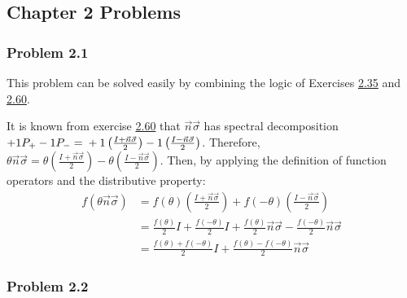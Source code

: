 \subsection{Chapter 2 Problems}
\subsubsection{Problem 2.1}
This problem can be solved easily by combining the
logic of Exercises
\hyperref[sec:nielsen-and-chuang-exercise-2-35]{2.35} and
\hyperref[sec:nielsen-and-chuang-exercise-2-60]{2.60}.

It is known from exercise \hyperref[sec:nielsen-and-chuang-exercise-2-60]{2.60}
that $\vec{n} \vec{\sigma}$ has spectral decomposition
$+1P_+ - 1P_- = \\ +1 \left( \frac{I + \vec{n}\vec{\sigma}}{2} \right)
-1 \left( \frac{I - \vec{n}\vec{\sigma}}{2} \right)$.
Therefore, $\theta \vec{n} \vec{\sigma} =
\theta \left( \frac{I + \vec{n}\vec{\sigma}}{2} \right)
- \theta \left( \frac{I - \vec{n}\vec{\sigma}}{2} \right)$.
Then, by applying the definition of function operators and
the distributive property:
%
\begin{align}
    f(\theta \vec{n} \vec{\sigma}) &= f(\theta) \left(
        \frac{I + \vec{n}\vec{\sigma}}{2} \right) +
        f(-\theta) \left( \frac{I - \vec{n}\vec{\sigma}}{2} \right) \\
    &= \frac{f(\theta)}{2}I + \frac{f(-\theta)}{2}I +
        \frac{f(\theta)}{2}\vec{n}\vec{\sigma} -
        \frac{f(-\theta)}{2}\vec{n}\vec{\sigma} \\
    &= \frac{f(\theta) + f(-\theta)}{2}I +
        \frac{f(\theta) - f(-\theta)}{2}\vec{n}\vec{\sigma}
\end{align}


\subsubsection{Problem 2.2}

